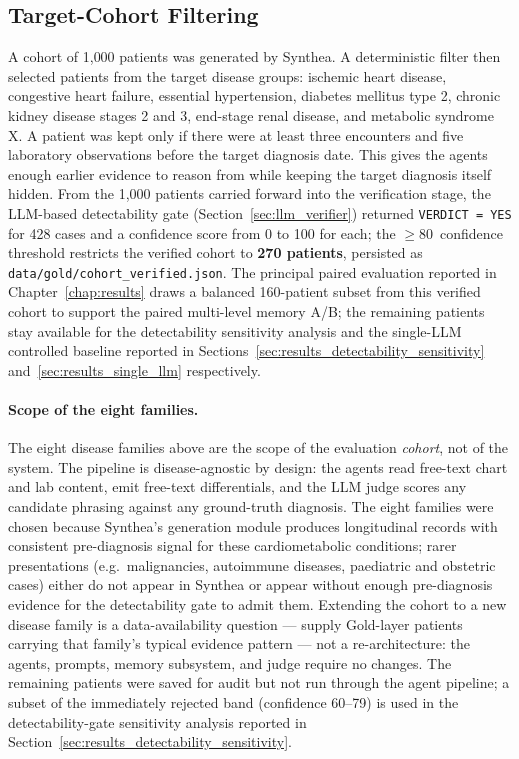 \subsection{Target-Cohort Filtering}
\label{sec:cohort_filtering}
A cohort of 1{,}000 patients was generated by Synthea. A deterministic
filter then selected patients from the target disease groups: ischemic
heart disease, congestive heart failure, essential hypertension, diabetes
mellitus type 2, chronic kidney disease stages 2 and 3, end-stage renal
disease, and metabolic syndrome X. A patient was kept only if there were
at least three encounters and five laboratory observations before the
target diagnosis date. This gives the agents enough earlier evidence to
reason from while keeping the target diagnosis itself hidden. From the
1{,}000 patients carried forward into the verification stage, the
LLM-based detectability gate
(Section~\ref{sec:llm_verifier}) returned \texttt{VERDICT~=~YES}
for 428 cases and a confidence score from 0 to 100 for each; the
$\geq 80$~confidence threshold restricts the verified cohort to
\textbf{270 patients}, persisted as
\texttt{data/gold/cohort\_verified.json}. The principal paired
evaluation reported in Chapter~\ref{chap:results} draws a balanced
160-patient subset from this verified cohort to support the paired
multi-level memory A/B; the remaining patients stay available for
the detectability sensitivity analysis and the single-LLM controlled
baseline reported in Sections~\ref{sec:results_detectability_sensitivity}
and~\ref{sec:results_single_llm} respectively.

\paragraph{Scope of the eight families.}
The eight disease families above are the scope of the evaluation
\emph{cohort}, not of the system. The pipeline is disease-agnostic by
design: the agents read free-text chart and lab content, emit
free-text differentials, and the LLM judge scores any candidate
phrasing against any ground-truth diagnosis. The eight families
were chosen because Synthea's generation module produces longitudinal
records with consistent pre-diagnosis signal for these cardiometabolic
conditions; rarer presentations (e.g.\ malignancies, autoimmune
diseases, paediatric and obstetric cases) either do not appear in
Synthea or appear without enough pre-diagnosis evidence for the
detectability gate to admit them. Extending the cohort to a new
disease family is a data-availability question --- supply Gold-layer
patients carrying that family's typical evidence pattern --- not a
re-architecture: the agents, prompts, memory subsystem, and judge
require no changes.
The remaining patients were saved for audit but not run through the
agent pipeline; a subset of the immediately rejected band (confidence
60--79) is used in the detectability-gate sensitivity analysis reported
in Section~\ref{sec:results_detectability_sensitivity}.

